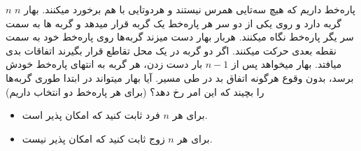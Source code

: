 $n$ پاره‌خط داریم که هیچ سه‌تایی همرس نیستند و هردوتایی با هم برخورد میکنند.
بهار $n$ گربه دارد و روی یکی از دو سر هر پاره‌خط یک گربه قرار میدهد و گربه ها به سمت سر یگر پاره‌خط نگاه میکنند.
هربار بهار دست میزند گربه‌ها روی پاره‌خط خود به سمت نقطه بعدی حرکت میکنند. اگر دو گربه در یک محل تقاطع قرار بگیرند اتفاقات بدی میافتد.
بهار میخواهد پس از $n - 1$ بار دست زدن، هر گربه به انتهای پاره‌خط خودش برسد، بدون وقوع هرگونه اتفاق بد در طی مسیر.
آیا بهار میتواند در ابتدا طوری گربه‌ها را بچیند که این امر رخ دهد؟ (برای هر پاره‌خط دو انتخاب داریم)
\begin{itemize}
    \item برای هر $n$ فرد ثابت کنید که امکان پذیر است.
    \item برای هر $n$ زوج ثابت کنید که امکان پذیر نیست.
\end{itemize}